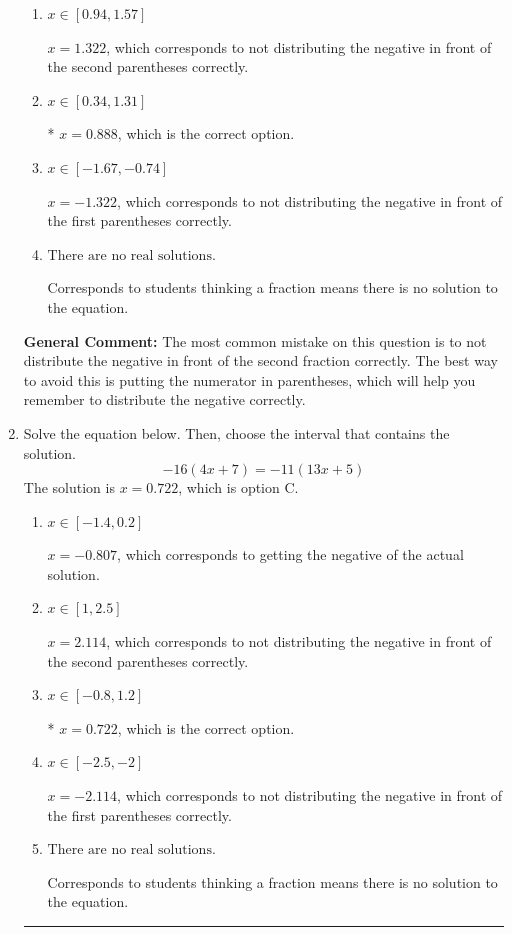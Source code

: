 \documentclass{extbook}[14pt]
\newcommand{\litem}[1]{\item #1

\rule{\textwidth}{0.4pt}}
\begin{document}
\begin{enumerate}
{\begin{enumerate}[label=\Alph*.]
$x = -4.372$, which corresponds to getting the negative of the actual solution.
\item \( x \in [0.94, 1.57] \)

$x = 1.322$, which corresponds to not distributing the negative in front of the second parentheses correctly.
\item \( x \in [0.34, 1.31] \)

* $x = 0.888$, which is the correct option.
\item \( x \in [-1.67, -0.74] \)

$x = -1.322$, which corresponds to not distributing the negative in front of the first parentheses correctly.
\item \( \text{There are no real solutions.} \)

Corresponds to students thinking a fraction means there is no solution to the equation.
\end{enumerate}

\textbf{General Comment:} The most common mistake on this question is to not distribute the negative in front of the second fraction correctly. The best way to avoid this is putting the numerator in parentheses, which will help you remember to distribute the negative correctly.
}
\litem{
Solve the equation below. Then, choose the interval that contains the solution.
\[ -16(4x + 7) = -11(13x + 5) \]The solution is \( x = 0.722 \), which is option C.\begin{enumerate}[label=\Alph*.]
\item \( x \in [-1.4, 0.2] \)

$x = -0.807$, which corresponds to getting the negative of the actual solution.
\item \( x \in [1, 2.5] \)

$x = 2.114$, which corresponds to not distributing the negative in front of the second parentheses correctly.
\item \( x \in [-0.8, 1.2] \)

* $x = 0.722$, which is the correct option.
\item \( x \in [-2.5, -2] \)

$x = -2.114$, which corresponds to not distributing the negative in front of the first parentheses correctly.
\item \( \text{There are no real solutions.} \)

Corresponds to students thinking a fraction means there is no solution to the equation.
\end{enumerate}

}
\end{enumerate}
\end{document}
